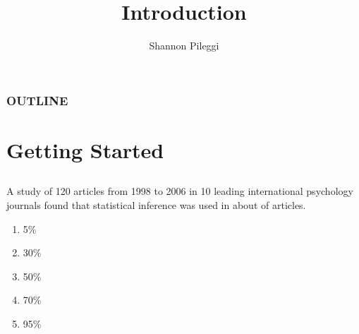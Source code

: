 





\title[Unit 1 Deck 1]{Introduction}
\author[Pileggi]{Shannon Pileggi}


\date{}




\begin{frame}
\titlepage
\end{frame}

\begin{frame}
\frametitle{OUTLINE\qquad\qquad\qquad} \tableofcontents[hideallsubsections]
\end{frame}


\section[Getting Started]{Getting Started}

\subsection{}
\begin{frame}
\begin{clicker}{A study of 120 articles from 1998 to 2006 in 10 leading international psychology journals found that statistical inference was used in about \underline{\hspace{0.5in}} of articles.}
\begin{enumerate}
    \item
    5\%
    \item
    30\%
    \item
    50\%
    \item
    70\%
    \item
    95\%
\end{enumerate}
\end{clicker}
\end{frame}

